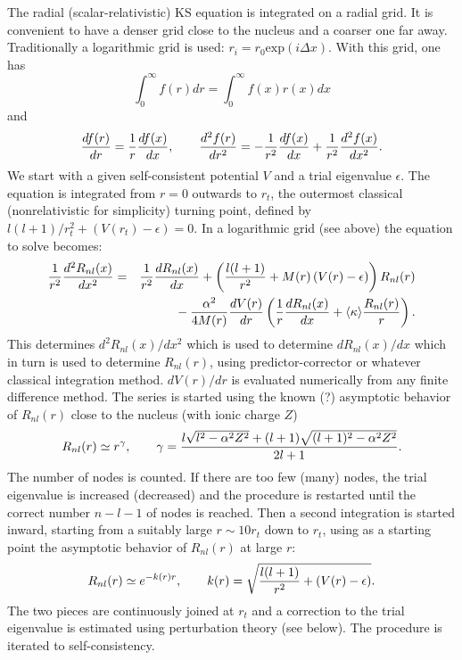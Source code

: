 \documentclass[12pt,a4paper]{article}
\begin{document}
The radial (scalar-relativistic) KS equation is integrated 
on a radial grid. It is convenient to
have a denser grid close to the nucleus and a coarser one far
away. Traditionally a logarithmic grid is used: 
$r_i=r_0\mbox{exp}(i\Delta x)$. With this grid, one has
\begin{equation}
\int_0^\infty f(r) d r = \int_0^\infty f(x) r(x) dx
\end{equation}
and
\begin{equation}
{d f(r)\over d r}={1\over r} {d f(x)\over d x},\qquad
{d^2 f(r)\over d r^2}=-{1\over r^2} {d f(x)\over d x}
+ {1\over r^2} {d^2 f(x)\over d x^2}.
\end{equation}
We start with a given self-consistent potential $V$ and
a trial eigenvalue $\epsilon$. The equation is integrated
from $r=0$ outwards to $r_t$, the outermost classical 
(nonrelativistic for simplicity) turning point, defined
by $ {l(l+1) /r_t^2} + \left(V(r_t)-\epsilon\right)=0$.
In a logarithmic grid (see above) the equation to solve becomes:
\begin{eqnarray}
{1\over r^2} {d^2 R_{nl}(x)\over d x^2} & = & 
  {1\over r^2} {d R_{nl}(x)\over d x} + 
  \left( {l(l+1)\over r^2} + 
  M(r)\left(V(r)-\epsilon\right) \right) R_{nl}(r) \nonumber \\
 & & \mbox{} - {\alpha^2\over 4M(r)} {dV(r)\over dr} 
      \left({1\over r} {dR_{nl}(x)\over dx} +
            \langle\kappa\rangle {R_{nl}(r)\over r}\right).
\end{eqnarray}
This determines ${d^2 R_{nl}(x)/d x^2}$ which is used to
determine ${d R_{nl}(x)/ dx}$ which in turn is used to
determine $R_{nl}(r)$, using predictor-corrector or whatever
classical integration method. ${dV(r)/dr}$ is evaluated
numerically from any finite difference method. The series
is started using the known (?) asymptotic behavior of $R_{nl}(r)$ 
close to the nucleus (with ionic charge $Z$)
\begin{equation}
R_{nl}(r)\simeq r^\gamma,\qquad \gamma={l\sqrt{l^2-\alpha^2 Z^2}+
(l+1)\sqrt{(l+1)^2-\alpha^2 Z^2}\over 2l+1}.
\end{equation}
The number of nodes is counted. If there are too few (many)
nodes, the trial eigenvalue is increased (decreased) and
the procedure is restarted until the correct number $n-l-1$
of nodes is reached. Then a second integration is started 
inward, starting from a suitably large $r\sim 10r_t$ down 
to $r_t$, using as a starting point the asymptotic behavior 
of $R_{nl}(r)$ at large $r$: 
\begin{equation}
R_{nl}(r)\simeq e^{-k(r)r},\qquad 
k(r)=\sqrt{{l(l+1)\over r^2} + \left(V(r)-\epsilon\right)}.
\end{equation}
The two pieces are continuously joined at $r_t$ and a correction to the trial 
eigenvalue is estimated using perturbation theory (see below). The procedure 
is iterated to self-consistency.
\end{document}
